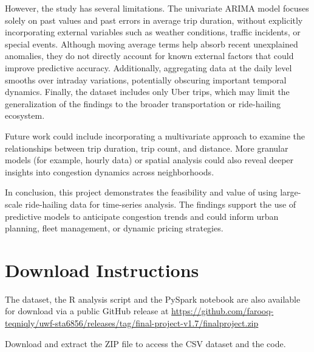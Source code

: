 \documentclass{article}
\begin{document}
However, the study has several limitations. The univariate ARIMA model focuses solely on past values and past errors in average trip duration, without explicitly incorporating external variables such as weather conditions, traffic incidents, or special events. Although moving average terms help absorb recent unexplained anomalies, they do not directly account for known external factors that could improve predictive accuracy. Additionally, aggregating data at the daily level smooths over intraday variations, potentially obscuring important temporal dynamics. Finally, the dataset includes only Uber trips, which may limit the generalization of the findings to the broader transportation or ride-hailing ecosystem.

Future work could include incorporating a multivariate approach to examine the relationships between trip duration, trip count, and distance. More granular models (for example, hourly data) or spatial analysis could also reveal deeper insights into congestion dynamics across neighborhoods.

In conclusion, this project demonstrates the feasibility and value of using large-scale ride-hailing data for time-series analysis. The findings support the use of predictive models to anticipate congestion trends and could inform urban planning, fleet management, or dynamic pricing strategies.


\appendix

\section{Download Instructions}
\label{sec:downloads}

The dataset, the R analysis script and the PySpark notebook are also available for download via a public GitHub release at \url{https://github.com/farooq-teqniqly/uwf-sta6856/releases/tag/final-project-v1.7/finalproject.zip}

Download and extract the ZIP file to access the CSV dataset and the code.
\end{document}
